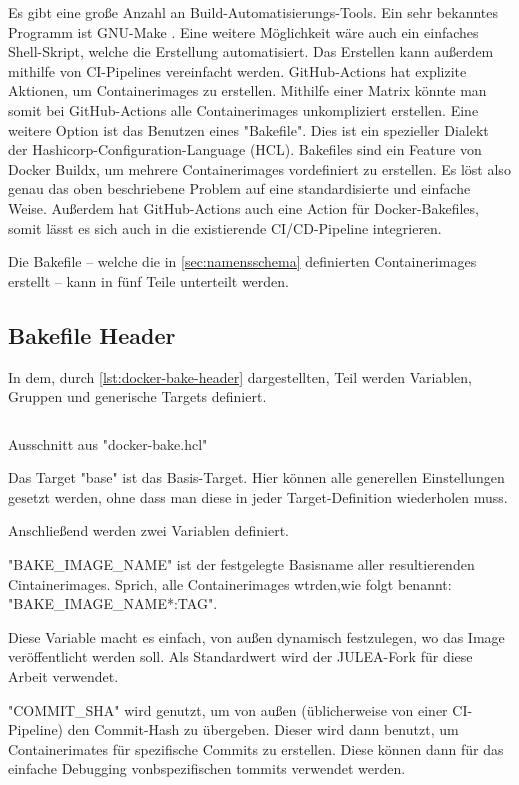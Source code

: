 Es gibt eine große Anzahl an Build-Automatisierungs-Tools. Ein sehr bekanntes Programm ist GNU-Make \cite{gnuGNUMake}. Eine weitere Möglichkeit wäre auch ein einfaches Shell-Skript, welche die Erstellung automatisiert. Das Erstellen kann außerdem mithilfe von CI-Pipelines vereinfacht werden. GitHub-Actions hat explizite Aktionen, um Containerimages zu erstellen. Mithilfe einer Matrix könnte man somit bei GitHub-Actions alle Containerimages unkompliziert erstellen. Eine weitere Option ist das Benutzen eines "Bakefile". Dies ist ein spezieller Dialekt der Hashicorp-Configuration-Language (HCL). Bakefiles sind ein Feature von Docker Buildx, um mehrere Containerimages vordefiniert zu erstellen. Es löst also genau das oben beschriebene Problem auf eine standardisierte und einfache Weise. Außerdem hat GitHub-Actions auch eine Action für Docker-Bakefiles, somit lässt es sich auch in die existierende CI/CD-Pipeline integrieren. 

Die Bakefile – welche die in \cref{sec:namensschema} definierten Containerimages erstellt – kann in fünf Teile unterteilt werden.

\subsection{Bakefile Header}

In dem, durch \cref{lst:docker-bake-header} dargestellten, Teil werden Variablen, Gruppen und generische Targets definiert.

\begin{listing}[H]
    \inputminted[firstline=1,lastline=7]{./lexers/docker-bake-lexer.py}{./code-examples/docker-bake.hcl}
    \caption{Ausschnitt aus "docker-bake.hcl"}
    \label{lst:docker-bake-header}
\end{listing}

Das Target "base" ist das Basis-Target. Hier können alle generellen Einstellungen gesetzt werden, ohne dass man diese in jeder Target-Definition wiederholen muss. 

Anschließend werden zwei Variablen definiert. 

"BAKE\_IMAGE\_NAME" ist der festgelegte Basisname aller resultierenden Cintainerimages. Sprich, alle Containerimages wtrden,wie folgt benannt: "BAKE\_IMAGE\_NAME*:TAG".

Diese Variable macht es einfach, von außen dynamisch festzulegen, wo das Image veröffentlicht werden soll. Als Standardwert wird der JULEA-Fork für diese Arbeit verwendet.

"COMMIT\_SHA" wird genutzt, um von außen (üblicherweise von einer CI-Pipeline) den Commit-Hash zu übergeben. Dieser wird dann benutzt, um Containerimates für spezifische Commits zu erstellen. Diese können dann für das einfache Debugging vonbspezifischen tommits verwendet werden.

